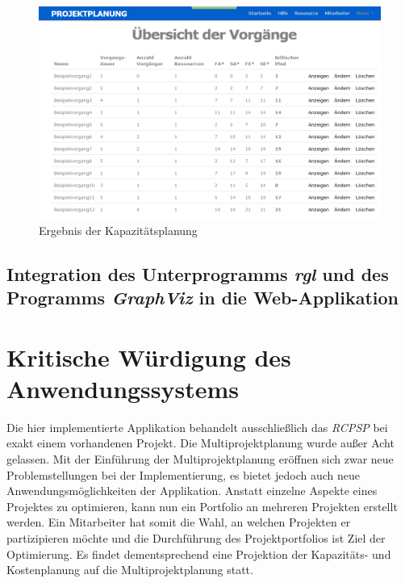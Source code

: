\documentclass[a4paper,12pt,parskip,bibtotoc,liststotoc]{article}
\begin{document}
\begin{figure}[h!]
  \begin{center}
    \includegraphics[width=120mm]{Bilder/Vorgaenge_Kostenpl.png}
    \caption{Ergebnis der Kapazitätsplanung}  \label{VorKo}
  \end{center}
\end{figure}

\subsection{Integration des Unterprogramms \textit{\glqq rgl\grqq} und des Programms \textit{GraphViz} in die Web-Applikation}\label{rgl-kapitel}

\section{Kritische Würdigung des Anwendungssystems} \label{krit}
Die hier implementierte Applikation behandelt ausschließlich das \textit{RCPSP} bei exakt einem vorhandenen Projekt. Die Multiprojektplanung wurde außer Acht gelassen. Mit der Einführung der Multiprojektplanung eröffnen sich zwar neue Problemstellungen bei der Implementierung, es bietet jedoch auch neue Anwendungsmöglichkeiten der Applikation. Anstatt einzelne Aspekte eines Projektes zu optimieren, kann nun ein Portfolio an mehreren Projekten erstellt werden. Ein Mitarbeiter hat somit die Wahl, an welchen Projekten er partizipieren möchte und die Durchführung des Projektportfolios ist Ziel der Optimierung. Es findet dementsprechend eine Projektion der Kapazitäts- und Kostenplanung auf die Multiprojektplanung statt.\\
\end{document}
